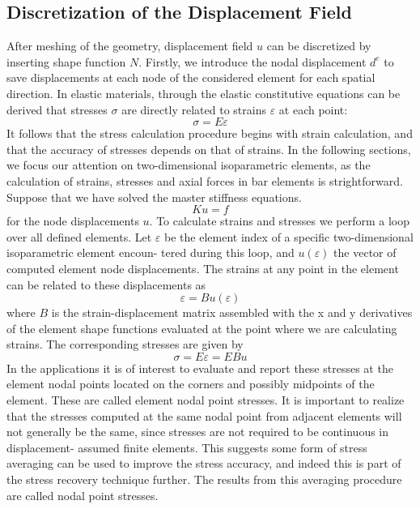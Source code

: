\subsection{Discretization of the Displacement Field}
After meshing of the geometry, displacement field $u$ can be discretized by inserting shape function $N$. Firstly, we introduce the nodal displacement $d^e$ to save displacements at each node of the considered element for each spatial direction.
In elastic materials, through the elastic constitutive equations can be derived that stresses $\sigma$ are directly related to strains $\varepsilon$ at each point:
\begin{equation}
\sigma = E\varepsilon
\end{equation}
It follows that the stress calculation procedure begins with strain calculation, and that the accuracy of stresses depends on that of strains. In the following sections, we focus our attention on two-dimensional isoparametric elements, as the calculation of strains, stresses and axial forces in bar elements is strightforward. Suppose that we have solved the master stiffness equations. 
\begin{equation}
Ku = f
\end{equation}
for the node displacements $u$. To calculate strains and stresses we perform a loop over all defined elements. Let $\varepsilon$ be the element index of a specific two-dimensional isoparametric element encoun- tered during this loop, and $u(\varepsilon)$ the vector of computed element node displacements. The strains at any point in the element can be related to these displacements as 
\begin{equation}
\varepsilon = Bu(\varepsilon) 
\end{equation}
where $B$ is the strain-displacement matrix assembled with the x and y derivatives of the element shape functions evaluated at the point where we are calculating strains. The corresponding stresses are given by 
\begin{equation}
\sigma = E\varepsilon = EBu 
\end{equation}
In the applications it is of interest to evaluate and report these stresses at the element nodal points located on the corners and possibly midpoints of the element. These are called element nodal point stresses.
It is important to realize that the stresses computed at the same nodal point from adjacent elements will not generally be the same, since stresses are not required to be continuous in displacement- assumed finite elements. This suggests some form of stress averaging can be used to improve the stress accuracy, and indeed this is part of the stress recovery technique further. The results from this averaging procedure are called nodal point stresses.

